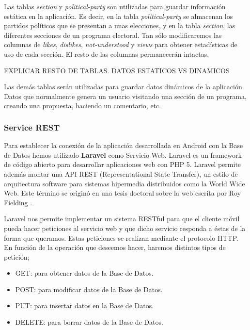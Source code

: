 Las tablas \textit{section} y \textit{political-party} son utilizadas para guardar información estática en la aplicación. Es decir, en la tabla \textit{political-party} se almacenan los partidos políticos que se presentan a unas elecciones, y en la tabla \textit{section}, las diferentes secciones de un programa electoral. Tan sólo modificaremos las columnas de \textit{likes}, \textit{dislikes}, \textit{not-understood} y \textit{views} para obtener estadísticas de uso de cada sección. El resto de las columnas permanecerán intactas.

EXPLICAR RESTO DE TABLAS. DATOS ESTATICOS VS DINAMICOS

Las demás tablas serán utilizadas para guardar datos dinámicos de la aplicación. Datos que normalmente genera un usuario visitando una sección de un programa, creando una propuesta, haciendo un comentario, etc.

\subsubsection{Service REST}\label{sssec:rest}

Para establecer la conexión de la aplicación desarrollada en Android con la Base de Datos hemos utilizado \textbf{Laravel} como Servicio Web. Laravel \cite{ref:laravel} es un framework de código abierto para desarrollar aplicaciones web con PHP 5. Laravel permite además montar una API REST (Representational State Transfer), un estilo de arquitectura software para sistemas hipermedia distribuidos como la World Wide Web. Este término se originó en una tesis doctoral sobre la web escrita por Roy Fielding \cite{ref:RESTPhd}.

Laravel nos permite implementar un sistema RESTful para que el cliente móvil pueda hacer peticiones al servicio web y que dicho servicio responda a éstas de la forma que queramos. Estas peticiones se realizan mediante el protocolo HTTP. En función de la operación que deseemos hacer, haremos distintos tipos de petición;

\begin{itemize}
	\item GET: para obtener datos de la Base de Datos.
	\item POST: para modificar datos de la Base de Datos.
	\item PUT: para insertar datos en la Base de Datos.
	\item DELETE: para borrar datos de la Base de Datos.
\end{itemize}

